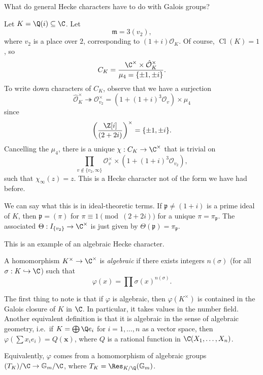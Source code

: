 \documentclass[a4paper]{article}
\renewcommand\G{\mathbb{G}}
\DeclareMathOperator\Cl{\mathrm{Cl}}
\begin{document}
What do general Hecke characters have to do with Galois groups?
\begin{ex}
  Let $K = \Q(i) \subseteq \C$. Let
  \[
    \mathfrak{m} = 3 (v_2),
  \]
  where $v_2$ is a place over $2$, corresponding to $(1 + i) \mathcal{O}_K$. Of course, $\Cl(K) = 1$, so
  \[
    C_K = \frac{\C^\times \times \hat{\mathcal{O}}_K^\times}{\mu_4 = \{\pm 1, \pm i\}}.
  \]
  To write down characters of $C_K$, observe that we have a surjection
  \[
    \hat{\mathcal{O}}_K^\times \twoheadrightarrow \mathcal{O}_{v_2}^\times = (1 + (1 + i)^3 \mathcal{O}_v) \times \mu_4
  \]
  since
  \[
    \left(\frac{\Z[i]}{(2 + 2i)}\right)^\times = \{\pm 1, \pm i\}.
  \]
  Cancelling the $\mu_4$, there is a unique $\chi: C_K \to \C^\times$ that is trivial on
  \[
    \prod_{v \not \in \{v_2, \infty\}} \mathcal{O}_v^\times \times (1 + (1 + i)^3 \mathcal{O}_{v_2}),
  \]
  such that $\chi_\infty(z) = z$. This is a Hecke character not of the form we have had before.

  We can say what this is in ideal-theoretic terms. If $\mathfrak{p} \not= (1 + i)$ is a prime ideal of $K$, then $\mathfrak{p} = (\pi)$ for $\pi \equiv 1 \pmod (2 + 2i)$ for a unique $\pi = \pi_\mathfrak{p}$. The associated $\Theta: I_{\{v_2\}} \to \C^\times$ is just given by $\Theta(\mathfrak{p}) = \pi_\mathfrak{p}$.

  This is an example of an algebraic Hecke character.
\end{ex}

\begin{defi}
  A homomorphism $K^\times \to \C^\times$ is \emph{algebraic} if there exists integers $n(\sigma)$ (for all $\sigma: K \hookrightarrow \C$) such that
  \[
    \varphi(x) = \prod \sigma(x)^{n(\sigma)}.
  \]
\end{defi}
The first thing to note is that if $\varphi$ is algebraic, then $\varphi(K^\times)$ is contained in the Galois closure of $K$ in $\C$. In particular, it takes values in the number field. Another equivalent definition is that it is algebraic in the sense of algebraic geometry, i.e.\ if $K = \bigoplus \Q e_i$ for $i = 1, \ldots, n$ as a vector space, then $\varphi(\sum x_i e_i) = Q(\mathbf{x})$, where $Q$ is a rational function in $\C(X_1, \ldots, X_n)$.

Equivalently, $\varphi$ comes from a homomorphism of algebraic groups $(T_K)/\C \to \G_m/\C$, where $T_K = \Res_{K/\Q}(\G_m)$.

\printindex
\end{document}
